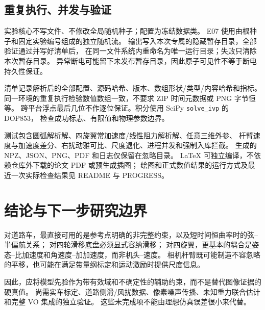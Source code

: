 \documentclass[UTF8,a4paper,fontset=fandol,11pt]{ctexart}
\begin{document}
\subsection{重复执行、并发与验证}
实验核心不写文件、不修改全局随机种子；配置为冻结数据类。
E07 使用由根种子和固定实验编号组成的独立随机流\cite{numpy}。
输出写入本次专属的隐藏暂存目录，全部验证通过并写好清单后，
在同一文件系统内重命名为唯一运行目录；失败只清除本次暂存目录。
异常断电可能留下未发布暂存目录，因此原子可见性不等于断电持久性保证。

清单记录解析后的全部配置、源码哈希、版本、数组形状/类型/内容哈希和指标。
同一环境的重复执行检验数值数组一致，不要求 ZIP 时间元数据或 PNG 字节恒等。
跨平台浮点最后几位不作逐位保证。积分使用 SciPy \texttt{solve\_ivp} 的 DOP853，
检查成功标志、有限值和物理参数边界\cite{scipy}。

测试包含圆弧解析解、四旋翼常加速度/线性阻力解析解、任意三维外参、
杆臂速度与加速度差分、右扰动雅可比、尺度退化、进程并发和强制入库拦截。
生成的 NPZ、JSON、PNG、PDF 和日志仅保留在忽略目录。
LaTeX 可独立编译，不依赖仓库外下载的论文 PDF 或预生成插图；
绘图和正式数值结果的运行方式及最近一次实际检查结果见 README 与 PROGRESS。

\section{结论与下一步研究边界}
对道路车，最直接可用的是参考点明确的非完整约束，以及短时间恒曲率时的弦--半偏航关系；
对四轮滑移底盘必须显式容纳滑移；
对四旋翼，更基本的耦合是姿态--比加速度和角速度--加加速度，而非机头--速度。
相机杆臂既可能制造不容忽略的平移，也可能在满足带量纲标定和运动激励时提供尺度信息。

因此，应将模型先验作为带有效域和不确定性的辅助约束，而不是替代图像证据的硬真值。
尚需实车标定、道路侧滑/风扰数据、像素噪声传播、未知重力联合估计和完整 VO 集成的独立验证。
这些未完成项不能由理想仿真误差很小来代替。
\end{document}
